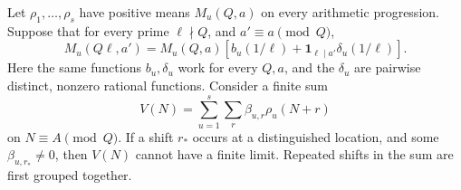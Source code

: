 \begin{lemma}\label{lem:multimean}
Let $\rho_1,\ldots,\rho_s$ have positive means $M_u(Q,a)$ on every
arithmetic progression. Suppose that for every prime
$\ell\nmid Q$, and $a'\equiv a\pmod Q$,
\begin{equation}\label{eq:localresponse}
 M_u(Q\ell,a')=M_u(Q,a)
 \left[b_u(1/\ell)+\mathbf1_{\ell\mid a'}\delta_u(1/\ell)\right].
\end{equation}
Here the same functions $b_u,\delta_u$ work for every $Q,a$, and
the $\delta_u$ are pairwise distinct, nonzero rational functions.
Consider a finite sum
\[
 V(N)=\sum_{u=1}^s\sum_r\beta_{u,r}\rho_u(N+r)
\]
on $N\equiv A\pmod Q$. If a shift $r_*$ occurs at a distinguished
location, and some $\beta_{u,r_*}\ne0$, then $V(N)$ cannot have
a finite limit. Repeated shifts in the sum are first grouped together.
\end{lemma}
